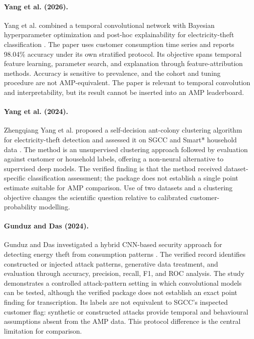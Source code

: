 \paragraph{Yang et al. (2026).}
Yang et al. combined a temporal convolutional network with Bayesian hyperparameter optimization and post-hoc explainability for electricity-theft classification \cite{Liupeng2026ExplainableETD}. The paper uses customer consumption time series and reports 98.04\% accuracy under its own stratified protocol. Its objective spans temporal feature learning, parameter search, and explanation through feature-attribution methods. Accuracy is sensitive to prevalence, and the cohort and tuning procedure are not AMP-equivalent. The paper is relevant to temporal convolution and interpretability, but its result cannot be inserted into an AMP leaderboard.

\paragraph{Yang et al. (2024).}
Zhengqiang Yang et al. proposed a self-decision ant-colony clustering algorithm for electricity-theft detection and assessed it on SGCC and Smart* household data \cite{Yang2024AntColony}. The method is an unsupervised clustering approach followed by evaluation against customer or household labels, offering a non-neural alternative to supervised deep models. The verified finding is that the method received dataset-specific classification assessment; the package does not establish a single point estimate suitable for AMP comparison. Use of two datasets and a clustering objective changes the scientific question relative to calibrated customer-probability modelling.

\paragraph{Gunduz and Das (2024).}
Gunduz and Das investigated a hybrid CNN-based security approach for detecting energy theft from consumption patterns \cite{Gunduz2024HybridCNN}. The verified record identifies constructed or injected attack patterns, generative data treatment, and evaluation through accuracy, precision, recall, F1, and ROC analysis. The study demonstrates a controlled attack-pattern setting in which convolutional models can be tested, although the verified package does not establish an exact point finding for transcription. Its labels are not equivalent to SGCC's inspected customer flag: synthetic or constructed attacks provide temporal and behavioural assumptions absent from the AMP data. This protocol difference is the central limitation for comparison.
